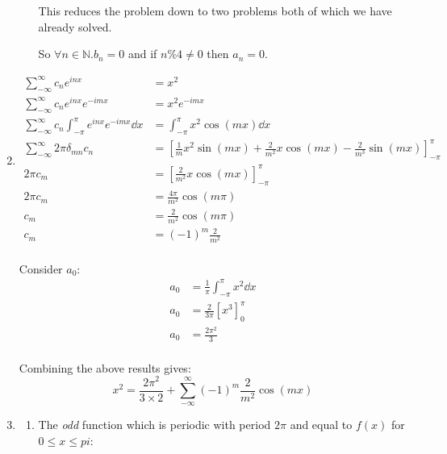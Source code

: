 \documentclass[10pt,\jkfside,a4paper]{article}
\begin{document}
\begin{enumerate}
\begin{enumerate}
This reduces the problem down to two problems both of which we have already solved.

So $\forall n \in \mathbb{N}. b_n = 0$ and if $n \% 4 \neq 0$ then $a_n = 0$.

\end{enumerate}

\item 

\[
\begin{split}
\sum^\infty_{-\infty}c_ne^{inx} &= x^2 \\
\sum^\infty_{-\infty}c_ne^{inx}e^{-imx} &= x^2e^{-imx} \\
\sum^\infty_{-\infty}c_n\int^\pi_{-\pi}e^{inx}e^{-imx} \dd{x} &= \int^\pi_{-\pi}x^2\cos(mx) \dd{x} \\
\sum^\infty_{-\infty}2\pi \delta_{mn}c_n &= \left[\frac{1}{m}x^2\sin(mx) + \frac{2}{m^2}x\cos(mx) - \frac{2}{m^3}\sin(mx)\right]^\pi_{-\pi} \\
2\pi c_m &= \left[\frac{2}{m^2}x\cos(mx)\right]^\pi_{-\pi} \\
2\pi c_m &= \frac{4\pi}{m^2}\cos(m\pi) \\
c_m &= \frac{2}{m^2}\cos(m\pi) \\
c_m &= (-1)^m\frac{2}{m^2} \\
\end{split}
\]

Consider $a_0$:
\[
\begin{split}
a_0 &= \frac{1}{\pi}\int^\pi_{-\pi} x^2 \dd{x} \\
a_0 &= \frac{2}{3\pi}\left[ x^3 \right]^\pi_0 \\
a_0 &= \frac{2\pi^2}{3} \\
\end{split}
\]

Combining the above results gives:
\[
x^2 = \frac{2\pi^2}{3 \times 2} + \sum^\infty_{-\infty} (-1)^m \frac{2}{m^2}\cos(mx)
\]

\item 

\begin{enumerate}

\item 

The \textit{odd} function which is periodic with period $2\pi$ and equal to $f(x)$ for 
$0 \leq x \leq pi$:

\begin{center}
\end{center}


\end{enumerate}
\end{enumerate}
\end{document}
